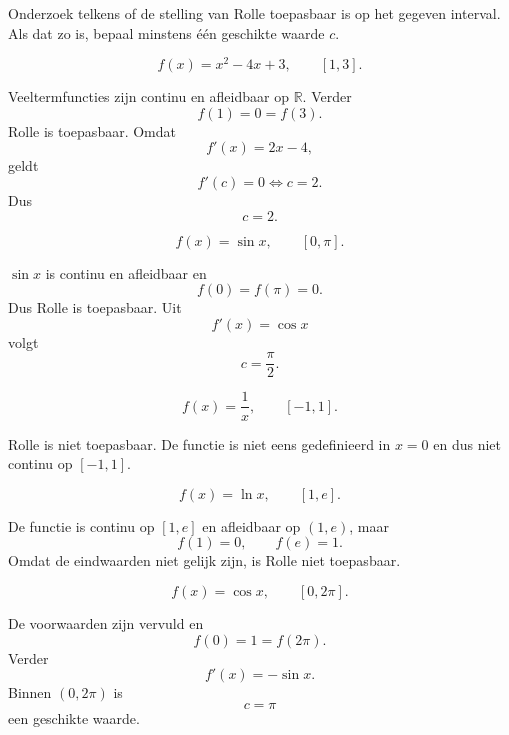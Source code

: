 \documentclass{ximera}
\begin{document}
\begin{oefening}{\oefB\ESS}
Onderzoek telkens of de stelling van Rolle toepasbaar is op het gegeven
interval. Als dat zo is, bepaal minstens één geschikte waarde \(c\).

\begin{question}
\[
f(x)=x^2-4x+3,\qquad [1,3].
\]
\begin{oplossing}
Veeltermfuncties zijn continu en afleidbaar op \(\mathbb{R}\).
Verder
\[
f(1)=0=f(3).
\]
Rolle is toepasbaar. Omdat
\[
f'(x)=2x-4,
\]
geldt
\[
f'(c)=0\Longleftrightarrow c=2.
\]
Dus
\[
\boxed{c=2}.
\]
\end{oplossing}
\end{question}

\begin{question}
\[
f(x)=\sin x,\qquad [0,\pi].
\]
\begin{oplossing}
\(\sin x\) is continu en afleidbaar en
\[
f(0)=f(\pi)=0.
\]
Dus Rolle is toepasbaar. Uit
\[
f'(x)=\cos x
\]
volgt
\[
\boxed{c=\frac{\pi}{2}}.
\]
\end{oplossing}
\end{question}

\begin{question}
\[
f(x)=\frac1x,\qquad [-1,1].
\]
\begin{oplossing}
Rolle is niet toepasbaar. De functie is niet eens gedefinieerd in
\(x=0\) en dus niet continu op \([-1,1]\).
\end{oplossing}
\end{question}

\begin{question}
\[
f(x)=\ln x,\qquad [1,e].
\]
\begin{oplossing}
De functie is continu op \([1,e]\) en afleidbaar op \((1,e)\), maar
\[
f(1)=0,\qquad f(e)=1.
\]
Omdat de eindwaarden niet gelijk zijn, is Rolle niet toepasbaar.
\end{oplossing}
\end{question}

\begin{question}
\[
f(x)=\cos x,\qquad [0,2\pi].
\]
\begin{oplossing}
De voorwaarden zijn vervuld en
\[
f(0)=1=f(2\pi).
\]
Verder
\[
f'(x)=-\sin x.
\]
Binnen \((0,2\pi)\) is
\[
\boxed{c=\pi}
\]
een geschikte waarde.
\end{oplossing}
\end{question}
\end{oefening}
\end{document}
